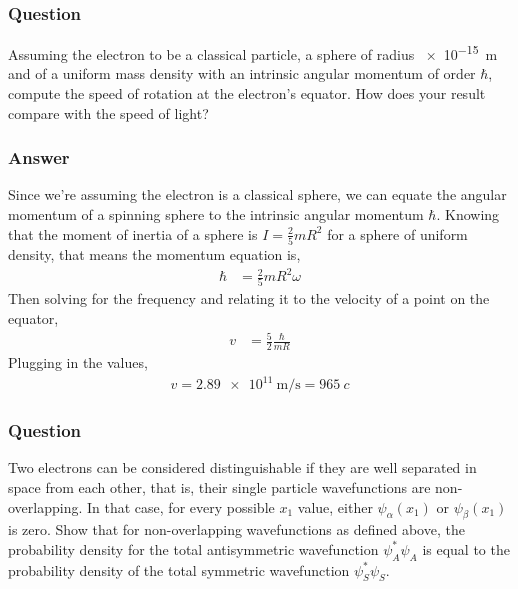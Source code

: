\subsubsection{Question}

Assuming the electron to be a classical particle, a sphere of radius 
\SI{e-15}{\m} and of a uniform mass density with an intrinsic angular 
momentum of order ${\hbar}$, compute the speed of rotation at the electron's 
equator. How does your result compare with the speed of light?

\subsubsection{Answer}

Since we're assuming the electron is a classical sphere, we can equate the 
angular momentum of a spinning sphere to the intrinsic angular momentum ${\hbar}$. 
Knowing that the moment of inertia of a sphere is $I = \frac 25 m R^2$ for a 
sphere of uniform density, that means the momentum equation is,
\begin{align*}
	\hbar &= \frac{2}{5}mR^2 \omega
\end{align*}
Then solving for the frequency and relating it to the velocity of a point on
the equator,
\begin{align*}
	v &= \frac 52 \frac{{\hbar}}{mR}
\end{align*}
Plugging in the values,
\begin{align}
	\boxed{ v = \SI{2.89e11}{\m\per\s} = \SI{965}{c} }
\end{align}


\subsubsection{Question}

Two electrons can be considered distinguishable if they are well separated 
in space from each other, that is, their single particle wavefunctions are 
non-overlapping. In that case, for every possible $x_1$ value, either 
$\psi_{\alpha}(x_1)$ or $\psi_\beta(x_1)$ is zero. Show that for non-overlapping wavefunctions 
as defined above, the probability density for the total antisymmetric 
wavefunction $\psi^*_A\psi_A$ is equal to the probability density of the total 
symmetric wavefunction $\psi^*_S\psi_S$.

